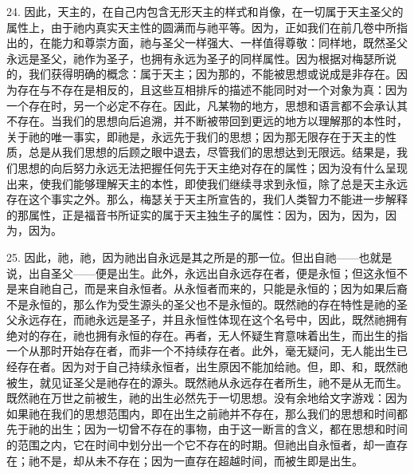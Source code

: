24. 因此，天主的，在自己内包含无形天主的样式和肖像，在一切属于天主圣父的属性上，由于祂内真实天主性的圆满而与祂平等。因为，正如我们在前几卷中所指出的，在能力和尊崇方面，祂与圣父一样强大、一样值得尊敬：同样地，既然圣父永远是圣父，祂作为圣子，也拥有永远为圣子的同样属性。因为根据对梅瑟所说的，我们获得明确的概念：属于天主；因为那的，不能被思想或说成是非存在。因为存在与不存在是相反的，且这些互相排斥的描述不能同时对一个对象为真：因为一个存在时，另一个必定不存在。因此，凡某物的地方，思想和语言都不会承认其不存在。当我们的思想向后追溯，并不断被带回到更远的地方以理解那的本性时，关于祂的唯一事实，即祂是，永远先于我们的思想；因为那无限存在于天主的性质，总是从我们思想的后顾之眼中退去，尽管我们的思想达到无限远。结果是，我们思想的向后努力永远无法把握任何先于天主绝对存在的属性；因为没有什么呈现出来，使我们能够理解天主的本性，即使我们继续寻求到永恒，除了总是天主永远存在这个事实之外。那么，梅瑟关于天主所宣告的，我们人类智力不能进一步解释的那属性，正是福音书所证实的属于天主独生子的属性：因为，因为，因为，因为，因为。\par

25. 因此，祂，祂，因为祂出自永远是其之所是的那一位。但出自祂——也就是说，出自圣父——便是出生。此外，永远出自永远存在者，便是永恒；但这永恒不是来自祂自己，而是来自永恒者。从永恒者而来的，只能是永恒的；因为如果后裔不是永恒的，那么作为受生源头的圣父也不是永恒的。既然祂的存在特性是祂的圣父永远存在，而祂永远是圣子，并且永恒性体现在这个名号中，因此，既然祂拥有绝对的存在，祂也拥有永恒的存在。再者，无人怀疑生育意味着出生，而出生的指一个从那时开始存在者，而非一个不持续存在者。此外，毫无疑问，无人能出生已经存在者。因为对于自己持续永恒者，出生原因不能加给祂。但，即、和，既然祂被生，就见证圣父是祂存在的源头。既然祂从永远存在者所生，祂不是从无而生。既然祂在万世之前被生，祂的出生必然先于一切思想。没有余地给文字游戏：因为如果祂在我们的思想范围内，即在出生之前祂并不存在，那么我们的思想和时间都先于祂的出生；因为一切曾不存在的事物，由于这一断言的含义，都在思想和时间的范围之内，它在时间中划分出一个它不存在的时期。但祂出自永恒者，却一直存在；祂不是，却从未不存在；因为一直存在超越时间，而被生即是出生。\par

